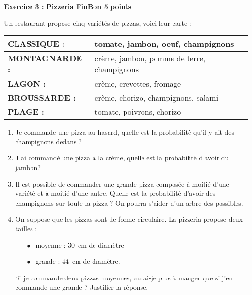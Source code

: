 \textbf{Exercice 3 : Pizzeria FinBon \hfill 5 points}

\bigskip
 
Un restaurant propose cinq variétés de pizzas, voici leur carte :

\begin{center}
\renewcommand\arraystretch{1.9}
\begin{tabularx}{0.75\linewidth}{|p{3cm}X|}\hline 
\textbf{CLASSIQUE :}& tomate, jambon, oeuf, champignons\\ \hline 
\textbf{MONTAGNARDE :}& crème, jambon, pomme de terre, champignons\\ \hline 
\textbf{LAGON :}& crème, crevettes, fromage\\ \hline 
\textbf{BROUSSARDE :}& crème, chorizo, champignons, salami\\ \hline 
\textbf{PLAGE :}& tomate, poivrons, chorizo\\ \hline
\end{tabularx}
\renewcommand\arraystretch{1.9}
\end{center}
 
\begin{enumerate}
\item Je commande une pizza au hasard, quelle est la probabilité qu'il y ait des champignons dedans ? 
\item J'ai commandé une pizza à la crème, quelle est la probabilité d'avoir du jambon? 
\item Il est possible de commander une grande pizza composée à moitié d'une variété et à moitié d'une autre. Quelle est la probabilité d'avoir des champignons sur toute la pizza ? On pourra s'aider d'un arbre des possibles. 
\item On suppose que les pizzas sont de forme circulaire. La pizzeria propose deux tailles :

\setlength\parindent{8mm} 
\begin{itemize}
\item[$\bullet~~$] moyenne : 30~cm de diamètre 
\item[$\bullet~~$] grande  : 44~cm de diamètre.
\end{itemize}
\setlength\parindent{0mm} 
 
Si je commande deux pizzas moyennes, aurai-je plus à manger que si j'en commande une grande ? Justifier la réponse. 
\end{enumerate}

\bigskip

